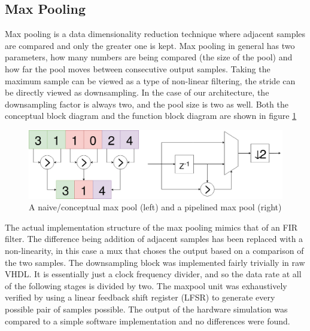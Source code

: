 \subsection{Max Pooling}
Max pooling is a data dimensionality reduction technique where adjacent samples are compared and only the greater one is kept.  Max pooling in general has two parameters, how many numbers are being compared (the size of the pool) and how far the pool moves between consecutive output samples.  Taking the maximum sample can be viewed as a type of non-linear filtering, the stride can be directly viewed as downsampling.  In the case of our architecture, the downsampling factor is always two, and the pool size is two as well.  Both the conceptual block diagram and the function block diagram are shown in figure \ref{fig:maxpool}

\begin{figure}[H]
\includegraphics[width=\textwidth]{maxpool.png}
\caption{A naive/conceptual max pool (left) and a pipelined max pool (right) }
\label{fig:maxpool}
\centering
\end{figure}

The actual implementation structure of the max pooling mimics that of an FIR filter.  The difference being addition of adjacent samples has been replaced with a non-linearity, in this case a mux that choses the output based on a comparison of the two samples.  The downsampling block was implemented fairly trivially in raw VHDL.  It is essentially just a clock frequency divider, and so the data rate at all of the following stages is divided by two.  The maxpool unit was exhaustively verified by using a linear feedback shift register (LFSR) to generate every possible pair of samples possible.  The output of the hardware simulation was compared to a simple software implementation and no differences were found.

